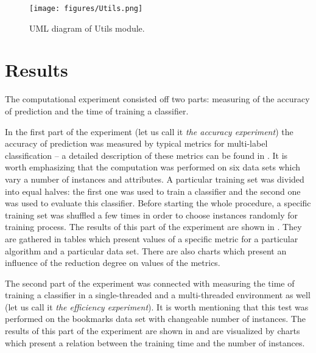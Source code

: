 \documentclass[english,a4paper,twoside]{ppfcmthesis}
\begin{document}
\begin{figure}
\centering
\caption{UML diagram of Utils module.}
\label{fig:utils_sh}
\texttt{[image: figures/Utils.png]}
\end{figure}


\chapter{Results}

The computational experiment consisted off two parts: measuring of the accuracy of prediction and the time of training a classifier. 

In the first part of the experiment (let us call it \textit{the accuracy experiment}) the accuracy of prediction was measured by typical metrics for multi-label classification -- a detailed description of these metrics can be found in . It is worth emphasizing that the computation was performed on six data sets which vary a number of instances and attributes. A particular training set was divided into equal halves: the first one was used to train a classifier and the second one was used to evaluate this classifier. Before starting the whole procedure, a specific training set was shuffled a few times in order to choose instances randomly for training process. The results of this part of the experiment are shown in . They are gathered in tables which present values of a specific metric for a particular algorithm and a particular data set. There are also charts which present an influence of the reduction degree on values of the metrics.   

The second part of the experiment was connected with measuring the time of training a classifier in a single-threaded and a multi-threaded environment as well (let us call it \textit{the efficiency experiment}). It is worth mentioning that this test was performed on the bookmarks data set with changeable number of instances. The results of this part of the experiment are shown in  and are visualized by charts which present a relation between the training time and the number of instances. 
\end{document}
